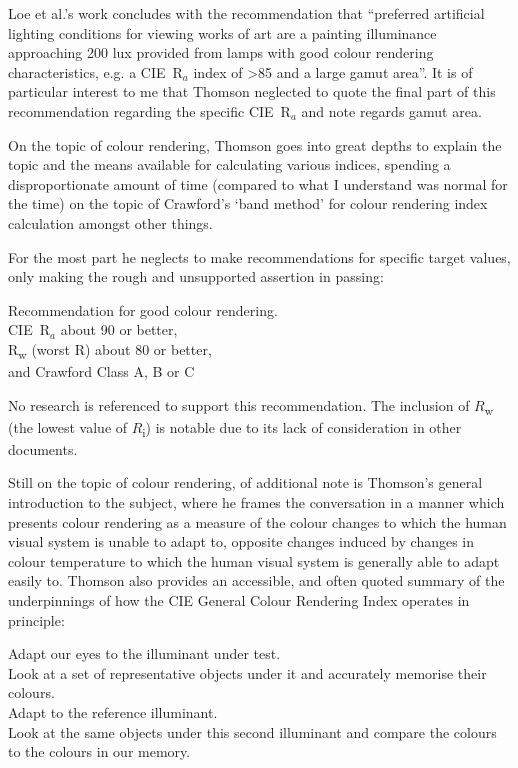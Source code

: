 Loe et al.'s work concludes with the recommendation that ``preferred artificial lighting conditions for viewing works of art are a painting illuminance approaching 200 lux provided from lamps with good colour rendering characteristics, e.g. a \gls{CIE}~R$_a$ index of \textgreater 85 and a large gamut area''. It is of particular interest to me that Thomson neglected to quote the final part of this recommendation regarding the specific \gls{CIE}~R$_a$ and note regards gamut area.

On the topic of colour rendering, Thomson goes into great depths to explain the topic and the means available for calculating various indices, spending a disproportionate amount of time (compared to what I understand was normal for the time) on the topic of Crawford's `band method' \citep{crawford_colour_1960,crawford_measurement_1959} for colour rendering index calculation amongst other things.

For the most part he neglects to make recommendations for specific target values, only making the rough and unsupported assertion in passing: 

\begin{itquote}{}
Recommendation for good colour rendering. \\
\gls{CIE}~R$_a$ about 90 or better, \\
R\textsubscript{w} (worst R) about 80 or better, \\
and Crawford Class A, B or C
\end{itquote}

No research is referenced to support this recommendation. The inclusion of $R$\textsubscript{w} (the lowest value of $R$\textsubscript{i}) is notable due to its lack of consideration in other documents. 

Still on the topic of colour rendering, of additional note is Thomson's general introduction to the subject, where he frames the conversation in a manner which presents colour rendering as a measure of the colour changes to which the human visual system is unable to adapt to, opposite changes induced by changes in colour temperature to which the human visual system is generally able to adapt easily to. Thomson also provides an accessible, and often quoted summary of the underpinnings of how the \gls{CIE} General Colour Rendering Index operates in principle:

\begin{itquote}{}
Adapt our eyes to the illuminant under test. \\
Look at a set of representative objects under it and accurately memorise their colours.\\
Adapt to the reference illuminant.\\
Look at the same objects under this second illuminant and compare the colours to the colours in our memory.
\end{itquote}

